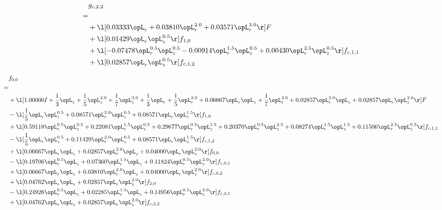 \begin{alignat}{2} 
\label{eq:g_22_0} 
& g_{c,2,2} \nonumber \\ 
 = \\ 
& + \l[  0.03333 \opL_r +  0.03810 \opL_r^{2.0} +  0.03571 \opL_r^{3.0}  \r] F \nonumber \\ 
& + \l[  0.01429 \opL_r \opL_z^{0.5}  \r] f_{1,0} \nonumber \\ 
& + \l[  -0.07478 \opL_r^{0.5} \opL_z^{0.5}   -0.00914 \opL_r^{1.5} \opL_z^{0.5} +  0.00430 \opL_r^{2.5} \opL_z^{0.5}  \r] f_{c,1,1} \nonumber \\ 
& + \l[  0.02857 \opL_r \opL_z^{0.5}  \r] f_{c,1,2} \nonumber \\ 
\end{alignat} 


\begin{alignat}{2} 
\label{eq:f_00_1} 
& f_{0,0} \nonumber \\ 
 = \\ 
& + \l[  1.00000 I + \frac{1}{3} \opL_z + \frac{1}{5} \opL_z^{2.0} + \frac{1}{7} \opL_z^{3.0} + \frac{1}{3} \opL_r + \frac{1}{5} \opL_r^{2.0} +  0.06667 \opL_r \opL_z + \frac{1}{7} \opL_r^{3.0} +  0.02857 \opL_r^{2.0} \opL_z +  0.02857 \opL_r \opL_z^{2.0}  \r] F \nonumber \\ 
& - \l[ \frac{1}{5} \opL_r \opL_z^{0.5} +  0.08571 \opL_r^{2.0} \opL_z^{0.5} +  0.08571 \opL_r \opL_z^{1.5}  \r] f_{1,0} \nonumber \\ 
& + \l[  0.59118 \opL_r^{0.5} \opL_z^{0.5} +  0.22081 \opL_r^{1.5} \opL_z^{0.5} +  0.29677 \opL_r^{0.5} \opL_z^{1.5} +  0.20370 \opL_r^{0.5} \opL_z^{2.5} +  0.08274 \opL_r^{1.5} \opL_z^{1.5} +  0.11506 \opL_r^{2.5} \opL_z^{0.5}  \r] f_{c,1,1} \nonumber \\ 
& - \l[ \frac{1}{5} \opL_r \opL_z^{0.5} +  0.11429 \opL_r^{2.0} \opL_z^{0.5} +  0.08571 \opL_r \opL_z^{1.5}  \r] f_{c,1,2} \nonumber \\ 
& + \l[  0.06667 \opL_r \opL_z +  0.02857 \opL_r^{2.0} \opL_z +  0.04000 \opL_r \opL_z^{2.0}  \r] f_{0,0} \nonumber \\ 
& - \l[  0.19706 \opL_r^{0.5} \opL_z +  0.07360 \opL_r^{1.5} \opL_z +  0.11824 \opL_r^{0.5} \opL_z^{2.0}  \r] f_{c,0,1} \nonumber \\ 
& + \l[  0.06667 \opL_r \opL_z +  0.03810 \opL_r^{2.0} \opL_z +  0.04000 \opL_r \opL_z^{2.0}  \r] f_{c,0,2} \nonumber \\ 
& + \l[  0.04762 \opL_r \opL_z +  0.02857 \opL_r \opL_z^{2.0}  \r] f_{2,0} \nonumber \\ 
& - \l[  0.24926 \opL_r^{0.5} \opL_z +  0.02285 \opL_r^{1.5} \opL_z +  0.14956 \opL_r^{0.5} \opL_z^{2.0}  \r] f_{c,2,1} \nonumber \\ 
& + \l[  0.04762 \opL_r \opL_z +  0.02857 \opL_r \opL_z^{2.0}  \r] f_{c,2,2} \nonumber \\ 
\end{alignat} 


